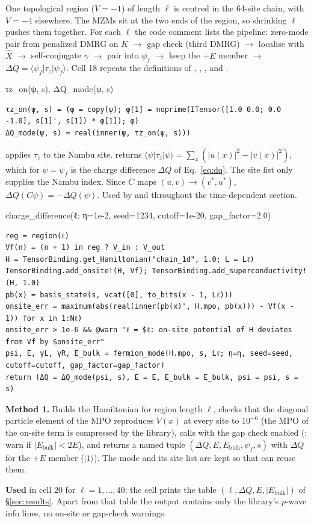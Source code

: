 \documentclass[11pt]{article}
\newcommand{\ket}[1]{\lvert #1\rangle}
\newcommand{\bra}[1]{\langle #1\rvert}
\begin{document}
One topological region ($V=-1$) of length $\ell$ is centred in the 64-site chain, with $V=-4$ elsewhere. The MZMs sit
at the two ends of the region, so shrinking $\ell$ pushes them together. For each $\ell$ the code comment lists the
pipeline: zero-mode pair from penalized DMRG on $K$ $\to$ gap check (third DMRG) $\to$ localise with $\hat X$ $\to$
self-conjugate $\gamma$ $\to$ pair into $\psi_f$ $\to$ keep the $+E$ member $\to$ $\Delta Q=\bra{\psi_f}\tau_z\ket{\psi_f}$.
Cell 18 repeats the definitions of , , ,  and .

\begin{function}{τz\_on(ψ, s), ΔQ\_mode(ψ, s)}
\begin{Verbatim}
τz_on(ψ, s) = (φ = copy(ψ); φ[1] = noprime(ITensor([1.0 0.0; 0.0 -1.0], s[1]', s[1]) * φ[1]); φ)
ΔQ_mode(ψ, s) = real(inner(ψ, τz_on(ψ, s)))
\end{Verbatim}
 applies $\tau_z$ to the Nambu site.  returns
$\bra{\psi}\tau_z\ket{\psi}=\sum_x(|u(x)|^2-|v(x)|^2)$, which for $\psi=\psi_f$ is the charge difference
$\Delta Q$ of Eq.~\eqref{eq:dq}. The site list  only supplies the Nambu index. Since $C$ maps
$(u,v)\to(v^*,u^*)$, $\Delta Q(C\psi)=-\Delta Q(\psi)$. Used by  and throughout the
time-dependent section.
\end{function}

\begin{function}{charge\_difference(ℓ; η=1e-2, seed=1234, cutoff=1e-20, gap\_factor=2.0)}
\begin{Verbatim}
reg = region(ℓ)
Vf(n) = (n + 1) in reg ? V_in : V_out
H = TensorBinding.get_Hamiltonian("chain_1d", 1.0; L = Lℓ)
TensorBinding.add_onsite!(H, Vf); TensorBinding.add_superconductivity!(H, 1.0)
pb(x) = basis_state(s, vcat([0], to_bits(x - 1, Lℓ)))
onsite_err = maximum(abs(real(inner(pb(x)', H.mpo, pb(x))) - Vf(x - 1)) for x in 1:Nℓ)
onsite_err > 1e-6 && @warn "ℓ = $ℓ: on-site potential of H deviates from Vf by $onsite_err"
psi, E, γL, γR, E_bulk = fermion_mode(H.mpo, s, Lℓ; η=η, seed=seed, cutoff=cutoff, gap_factor=gap_factor)
return (ΔQ = ΔQ_mode(psi, s), E = E, E_bulk = E_bulk, psi = psi, s = s)
\end{Verbatim}
\textbf{Method 1.} Builds the Hamiltonian for region length $\ell$, checks that the diagonal particle element of the
MPO reproduces $V(x)$ at every site to $10^{-6}$ (the MPO of the on-site term is compressed by the library), calls
 with the gap check enabled (: warn if $|E_{\text{bulk}}|<2E$), and returns
a named tuple $(\Delta Q, E, E_{\text{bulk}}, \psi_f, s)$ with $\Delta Q$ for the $+E$ member ($\ket{1}$). The
mode  and its site list  are kept so that  can reuse them.

\textbf{Used} in cell 20 for $\ell = 1,\dots,40$; the cell prints the table $(\ell,\Delta Q,E,|E_{\text{bulk}}|)$
of \S\ref{sec:results}. Apart from that table the output contains only the library's $p$-wave info lines, no on-site
or gap-check warnings.
\end{function}
\end{document}
